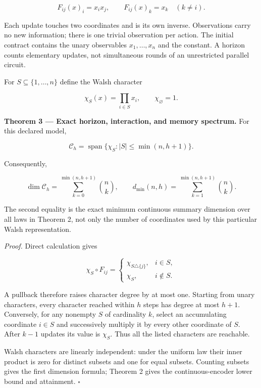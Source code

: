 \documentclass[11pt,a4paper]{article}
\begin{document}
\nopagebreak[4]

\[
F_{ij}(x)_i=x_ix_j,\qquad
F_{ij}(x)_k=x_k\quad(k\ne i).
\]

Each update touches two coordinates and is its own inverse. Observations
carry no new information; there is one trivial observation per action.
The initial contract contains the unary observables \(x_1,\ldots,x_n\)
and the constant. A horizon counts elementary updates, not simultaneous
rounds of an unrestricted parallel circuit.

For \(S\subseteq\{1,\ldots,n\}\) define the Walsh character

\nopagebreak[4]

\[
\chi_S(x)=\prod_{i\in S}x_i,\qquad \chi_\varnothing=1.
\]


\textbf{Theorem 3 --- Exact horizon, interaction, and memory spectrum.}
For this declared model,

\nopagebreak[4]

\[
\boxed{
\mathscr C_h=
\operatorname{span}\{\chi_S:|S|\le\min(n,h+1)\}.
}
\]

Consequently,

\nopagebreak[4]

\[
\boxed{
\dim\mathscr C_h=\sum_{k=0}^{\min(n,h+1)}\binom nk,
\qquad
 d_{\min}(n,h)=\sum_{k=1}^{\min(n,h+1)}\binom nk.
}
\]

The second equality is the exact minimum continuous summary dimension
over all laws in Theorem 2, not only the number of coordinates used by
this particular Walsh representation.

\emph{Proof.} Direct calculation gives

\nopagebreak[4]

\[
\chi_S\circ F_{ij}=
\begin{cases}
\chi_{S\triangle\{j\}},&i\in S,\\
\chi_S,&i\notin S.
\end{cases}
\]

A pullback therefore raises character degree by at most one. Starting
from unary characters, every character reached within \(h\) steps has
degree at most \(h+1\). Conversely, for any nonempty \(S\) of
cardinality \(k\), select an accumulating coordinate \(i\in S\) and
successively multiply it by every other coordinate of \(S\). After
\(k-1\) updates its value is \(\chi_S\). Thus all the listed characters
are reachable.

Walsh characters are linearly independent: under the uniform law their
inner product is zero for distinct subsets and one for equal subsets.
Counting subsets gives the first dimension formula; Theorem 2 gives the
continuous-encoder lower bound and attainment. \(\square\)
\end{document}
